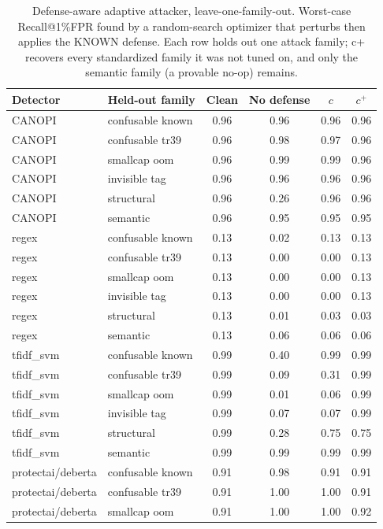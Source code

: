 \begin{table}[ht]\centering
\caption{Defense-aware adaptive attacker, leave-one-family-out. Worst-case Recall@1\%FPR found by a random-search optimizer that perturbs then applies the KNOWN defense. Each row holds out one attack family; c+ recovers every standardized family it was not tuned on, and only the semantic family (a provable no-op) remains.}
\label{tab:adaptive_v2}
\small
\begin{tabular}{ll cccc}
\toprule
Detector & Held-out family & Clean & No defense & $c$ & $c^{+}$ \\
\midrule
CANOPI & confusable known & 0.96 & 0.96 & 0.96 & 0.96 \\
CANOPI & confusable tr39 & 0.96 & 0.98 & 0.97 & 0.96 \\
CANOPI & smallcap oom & 0.96 & 0.99 & 0.99 & 0.96 \\
CANOPI & invisible tag & 0.96 & 0.96 & 0.96 & 0.96 \\
CANOPI & structural & 0.96 & 0.26 & 0.96 & 0.96 \\
CANOPI & semantic & 0.96 & 0.95 & 0.95 & 0.95 \\
regex & confusable known & 0.13 & 0.02 & 0.13 & 0.13 \\
regex & confusable tr39 & 0.13 & 0.00 & 0.00 & 0.13 \\
regex & smallcap oom & 0.13 & 0.00 & 0.00 & 0.13 \\
regex & invisible tag & 0.13 & 0.00 & 0.00 & 0.13 \\
regex & structural & 0.13 & 0.01 & 0.03 & 0.03 \\
regex & semantic & 0.13 & 0.06 & 0.06 & 0.06 \\
tfidf_svm & confusable known & 0.99 & 0.40 & 0.99 & 0.99 \\
tfidf_svm & confusable tr39 & 0.99 & 0.09 & 0.31 & 0.99 \\
tfidf_svm & smallcap oom & 0.99 & 0.01 & 0.06 & 0.99 \\
tfidf_svm & invisible tag & 0.99 & 0.07 & 0.07 & 0.99 \\
tfidf_svm & structural & 0.99 & 0.28 & 0.75 & 0.75 \\
tfidf_svm & semantic & 0.99 & 0.99 & 0.99 & 0.99 \\
protectai/deberta & confusable known & 0.91 & 0.98 & 0.91 & 0.91 \\
protectai/deberta & confusable tr39 & 0.91 & 1.00 & 1.00 & 0.91 \\
protectai/deberta & smallcap oom & 0.91 & 1.00 & 1.00 & 0.92 \\

\end{tabular}
\end{table}
